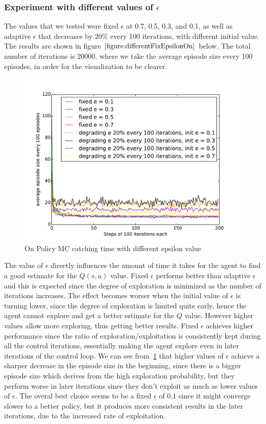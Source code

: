 \documentclass[paper=a4, fontsize=11pt]{scrartcl}
\numberwithin{equation}{section}		%
\numberwithin{figure}{section}			%
\numberwithin{table}{section}				%
\begin{document}
\subsubsection*{Experiment with different values of $\epsilon$}
The values that we tested were fixed $\epsilon$ at 0.7, 0.5, 0.3, and 0.1, as well as adaptive $\epsilon$ that decreases by $20\%$ every 100 iterations, with different initial value. The results are shown in figure $\ref{figure:differentFixEpsilonOn}$ below. The total number of iterations is  20000, where we take the average episode size every 100 episodes, in order for the visualization to be clearer. 
\begin{figure}[h] \centering
\includegraphics[scale=0.65]{on_policy_mc.pdf}
\caption{On Policy MC catching time with different epsilon value} \label{figure:differentFixEpsilonOn}
\end{figure}
The value of $\epsilon$ directly influences the amount of time it takes for the agent to find a good estimate for the $Q(s,a)$ value. Fixed $\epsilon$ performs better than adaptive $\epsilon$ and this is expected since the degree of exploration is minimized as the number of iterations increases. The effect becomes worser when the initial value of $\epsilon$ is turning lower, since the degree of exploration is limited quite early, hence the agent cannot explore and get a better estimate for the $Q$ value. However higher values allow more exploring, thus getting better results. Fixed $\epsilon$ achieves higher performance since the ratio of exploration/exploitation is consistently kept during all the control iterations, essentially making the agent explore even in later iterations of the control loop.  We can see from~\ref{figure:differentFixEpsilonOn} that higher  values of $\epsilon$ achieve a sharper decrease in the episode size in the beginning, since there is a bigger episode size which derives from the high exploration probability, but they perform worse in later iterations since they don't exploit as much as lower values of $\epsilon$. The overal best choice seems to be a fixed $\epsilon$ of $0.1$ since it might converge slower to a better policy, but it produces more consistent results in the later iterations, due to the increased rate of exploitation. 
\end{document}
